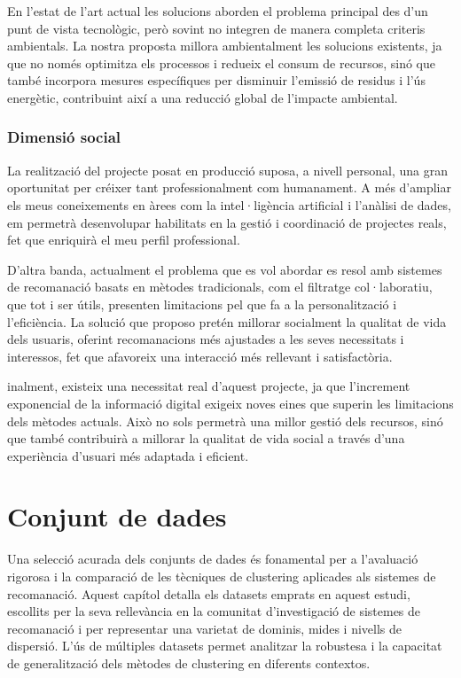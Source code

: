 \documentclass[a4paper,12pt]{report}
\begin{document}
En l’estat de l’art actual les solucions aborden el problema principal des d’un punt de vista tecnològic, però sovint no integren de manera completa criteris ambientals. La nostra proposta millora ambientalment les solucions existents, ja que no només optimitza els processos i redueix el consum de recursos, sinó que també incorpora mesures específiques per disminuir l’emissió de residus i l’ús energètic, contribuint així a una reducció global de l’impacte ambiental.

\subsection{Dimensió social}

La realització del projecte posat en producció suposa, a nivell personal, una gran oportunitat per créixer tant professionalment com humanament. A més d’ampliar els meus coneixements en àrees com la intel·ligència artificial i l’anàlisi de dades, em permetrà desenvolupar habilitats en la gestió i coordinació de projectes reals, fet que enriquirà el meu perfil professional.

D’altra banda, actualment el problema que es vol abordar es resol amb sistemes de recomanació basats en mètodes tradicionals, com el filtratge col·laboratiu, que tot i ser útils, presenten limitacions pel que fa a la personalització i l’eficiència. La solució que proposo pretén millorar socialment la qualitat de vida dels usuaris, oferint recomanacions més ajustades a les seves necessitats i interessos, fet que afavoreix una interacció més rellevant i satisfactòria.

inalment, existeix una necessitat real d’aquest projecte, ja que l’increment exponencial de la informació digital exigeix noves eines que superin les limitacions dels mètodes actuals. Això no sols permetrà una millor gestió dels recursos, sinó que també contribuirà a millorar la qualitat de vida social a través d’una experiència d’usuari més adaptada i eficient.

\chapter{Conjunt de dades}

Una selecció acurada dels conjunts de dades és fonamental per a l'avaluació rigorosa i la comparació de les tècniques de clustering aplicades als sistemes de recomanació.
Aquest capítol detalla els datasets emprats en aquest estudi, escollits per la seva rellevància en la comunitat d'investigació de sistemes de recomanació i per representar una varietat de dominis, mides i nivells de dispersió.
L'ús de múltiples datasets permet analitzar la robustesa i la capacitat de generalització dels mètodes de clustering en diferents contextos.
\end{document}
